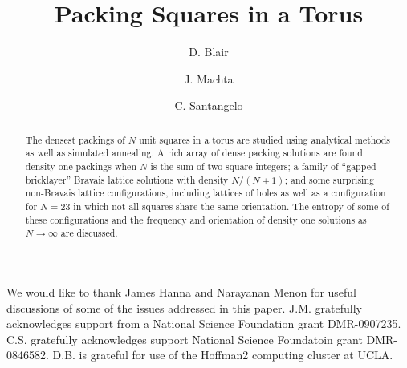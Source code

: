 \documentclass[preprint,aps]{revtex4}
\begin{document}
\title{Packing Squares in a Torus}

\author{D. Blair}

\author{J. Machta}

\author{C. Santangelo}

\begin{abstract}
The densest packings of $N$ unit squares in a torus are studied using analytical methods as well as simulated annealing.  A rich array of dense packing solutions are found: density one packings when $N$ is the sum of two square integers; a family of ``gapped bricklayer'' Bravais lattice
 solutions with density $N/(N+1)$; and some surprising non-Bravais lattice configurations, including lattices of holes as well as a configuration for $N=23$ in which not all squares share the same orientation.  The entropy of some of these configurations and the frequency and orientation of density one solutions as $N \rightarrow \infty$ are discussed.

\end{abstract} 
\maketitle


%

%


  



\begin{acknowledgements}
We would like to thank James Hanna and Narayanan Menon for useful discussions of some of the issues addressed in this paper.  J.M. gratefully acknowledges support from a National Science Foundation grant DMR-0907235. C.S. gratefully acknowledges support National Science Foundatoin grant DMR-0846582. D.B. is grateful for use of the Hoffman2 computing cluster at UCLA.
\end{acknowledgements}
\end{document}
